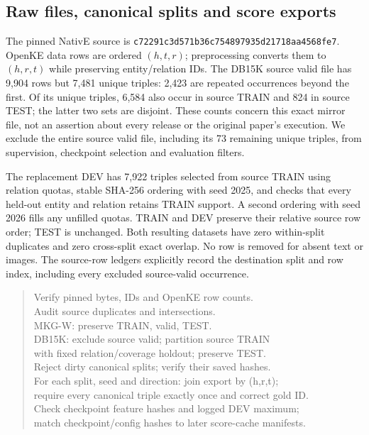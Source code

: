 \documentclass[11pt,a4paper]{article}
\begin{document}
\subsection{Raw files, canonical splits and score exports}
The pinned NativE source is \texttt{c72291c3d571b36c754897935d21718aa4568fe7}. OpenKE data rows are ordered $(h,t,r)$; preprocessing converts them to $(h,r,t)$ while preserving entity/relation IDs. The DB15K source valid file has 9,904 rows but 7,481 unique triples: 2,423 are repeated occurrences beyond the first. Of its unique triples, 6,584 also occur in source TRAIN and 824 in source TEST; the latter two sets are disjoint. These counts concern this exact mirror file, not an assertion about every release or the original paper's execution. We exclude the entire source valid file, including its 73 remaining unique triples, from supervision, checkpoint selection and evaluation filters.

The replacement DEV has 7,922 triples selected from source TRAIN using relation quotas, stable SHA-256 ordering with seed 2025, and checks that every held-out entity and relation retains TRAIN support. A second ordering with seed 2026 fills any unfilled quotas. TRAIN and DEV preserve their relative source row order; TEST is unchanged. Both resulting datasets have zero within-split duplicates and zero cross-split exact overlap. No row is removed for absent text or images. The source-row ledgers explicitly record the destination split and row index, including every excluded source-valid occurrence.

\begin{quote}\small\ttfamily
Verify pinned bytes, IDs and OpenKE row counts.\\
Audit source duplicates and intersections.\\
MKG-W: preserve TRAIN, valid, TEST.\\
DB15K: exclude source valid; partition source TRAIN\\
\hspace*{1em}with fixed relation/coverage holdout; preserve TEST.\\
Reject dirty canonical splits; verify their saved hashes.\\
For each split, seed and direction: join export by (h,r,t);\\
\hspace*{1em}require every canonical triple exactly once and correct gold ID.\\
Check checkpoint feature hashes and logged DEV maximum;\\
\hspace*{1em}match checkpoint/config hashes to later score-cache manifests.
\end{quote}
\end{document}
